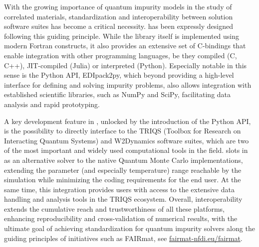 \documentclass[edipack_sp.tex]{subfiles}
\begin{document}
With the growing importance of  quantum impurity models in the study of correlated materials,
standardization and interoperability between solution software suites has
become a critical necessity.
\NAME has been expressly designed following this guiding principle. 
While the library itself is implemented using modern Fortran constructs, it also provides an extensive set of C-bindings that enable integration with other programming languages,
be they compiled (C, C++), JIT-compiled (Julia) or interpreted (Python). 
Especially notable in this sense is the Python API, EDIpack2py, which beyond providing a 
high-level interface for defining and solving impurity problems, also allows integration with established scientific libraries, such as NumPy and SciPy, facilitating data analysis and
rapid prototyping.

A key development feature in \NAME, unlocked by the introduction of the Python API, 
is the possibility to directly interface to the TRIQS (Toolbox for Research on Interacting Quantum Systems) and
W2Dynamics software suites, which are two of the most important and widely used computational tools in
the field. \NAME slots in as an alternative solver to the native Quantum Monte Carlo 
implementations, extending the parameter (and especially temperature) range reachable by 
the simulation while minimizing the coding requirements for the end user.
At the same time, this integration provides \NAME users with access to the
extensive data handling and analysis tools in the TRIQS ecosystem. 
Overall, interoperability extends the cumulative reach and trustworthiness of all these platforms,
enhancing reproducibility and cross-validation of numerical results, with the ultimate goal of achieving standardization for quantum impurity solvers along the guiding principles of initiatives such as FAIRmat, see \href{https://www.fairmat-nfdi.eu/fairmat/}{fairmat-nfdi.eu/fairmat}. 
\end{document}
